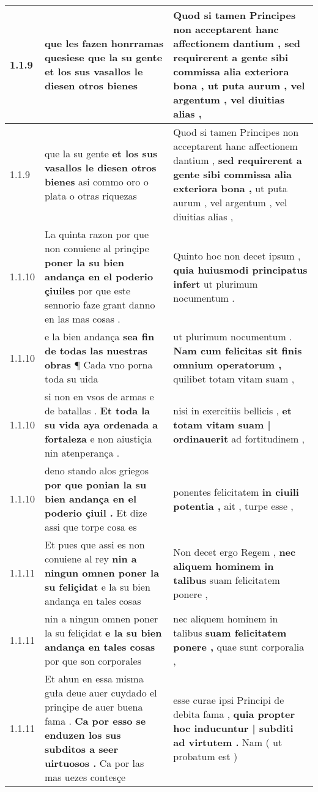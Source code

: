 \begin{tabular}{|p{1cm}|p{6.5cm}|p{6.5cm}|}
1.1.9 & que les fazen honrramas quesiese \textbf{ que la su gente } et los sus vasallos le diesen otros bienes & Quod si tamen Principes non acceptarent hanc affectionem dantium , \textbf{ sed requirerent a gente sibi commissa alia exteriora bona , } ut puta aurum , vel argentum , vel diuitias alias , \\\hline
1.1.9 & que la su gente \textbf{ et los sus vasallos le diesen otros bienes } asi commo oro o plata o otras riquezas & Quod si tamen Principes non acceptarent hanc affectionem dantium , \textbf{ sed requirerent a gente sibi commissa alia exteriora bona , } ut puta aurum , vel argentum , vel diuitias alias , \\\hline
1.1.10 & La quinta razon por que non conuiene al prinçipe \textbf{ poner la su bien andança en el poderio çiuiles } por que este sennorio faze grant danno en las mas cosas . & Quinto hoc non decet ipsum , \textbf{ quia huiusmodi principatus infert } ut plurimum nocumentum . \\\hline
1.1.10 & e la bien andança \textbf{ sea fin de todas las nuestras obras } ¶ Cada vno porna toda su uida & ut plurimum nocumentum . \textbf{ Nam cum felicitas sit finis omnium operatorum , } quilibet totam vitam suam , \\\hline
1.1.10 & si non en vsos de armas e de batallas . \textbf{ Et toda la su vida aya ordenada a fortaleza } e non aiustiçia nin atenperança . & nisi in exercitiis bellicis , \textbf{ et totam vitam suam | ordinauerit } ad fortitudinem , \\\hline
1.1.10 & deno stando alos griegos \textbf{ por que ponian la su bien andança en el poderio çiuil . } Et dize assi que torpe cosa es & ponentes felicitatem \textbf{ in ciuili potentia , } ait , turpe esse , \\\hline
1.1.11 & Et pues que assi es non conuiene al rey \textbf{ nin a ningun omnen poner la su feliçidat } e la su bien andança en tales cosas & Non decet ergo Regem , \textbf{ nec aliquem hominem in talibus } suam felicitatem ponere , \\\hline
1.1.11 & nin a ningun omnen poner la su feliçidat \textbf{ e la su bien andança en tales cosas } por que son corporales & nec aliquem hominem in talibus \textbf{ suam felicitatem ponere , } quae sunt corporalia , \\\hline
1.1.11 & Et ahun en essa misma guła deue auer cuydado el prinçipe de auer buena fama . \textbf{ Ca por esso se enduzen los sus subditos a seer uirtuosos . } Ca por las mas uezes contesçe & esse curae ipsi Principi de debita fama , \textbf{ quia propter hoc inducuntur | subditi ad virtutem . } Nam ( ut probatum est ) \\\hline

\end{tabular}
